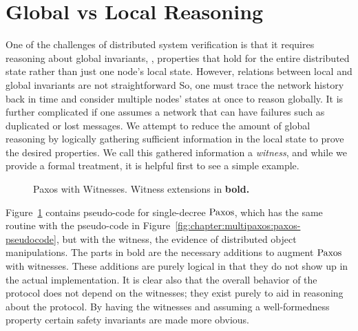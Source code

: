 \section{Global vs Local Reasoning}
\label{chapter:witnesspassing:sec:global-local-reasoning}

One of the challenges of distributed system verification is that it requires reasoning about
global invariants, \ie, properties that hold for the entire distributed state rather than just
one node's local state.
However, relations between local and global invariants are not straightforward 
So,  one must trace the network history back in time and consider multiple
nodes' states at once to reason globally.
It is further complicated if one assumes a network that can have failures such as duplicated
or lost messages.
We attempt to reduce the amount of global reasoning by logically gathering sufficient
information in the local state to prove the desired properties.
We call this gathered information a \textit{witness}, and while we provide a formal treatment, it is helpful first to see a simple example.

\begin{figure}
\begin{minipage}{\linewidth}
\noindent
\begin{multicols}{2}
  
\end{multicols}
\end{minipage}
\caption{Paxos with Witnesses. Witness extensions in \bfseries{bold}.}
\label{fig:chapter:witnesspassing:paxos-witness}
\end{figure}

Figure~\ref{fig:chapter:witnesspassing:paxos-witness} contains pseudo-code for single-decree $\mathrm{Paxos}$,
which has the same routine with the pseudo-code in Figure~\ref{fig:chapter:multipaxos:paxos-pseudocode},
but with the witness, the evidence of distributed object manipulations.
The parts in bold are the necessary additions to augment $\mathrm{Paxos}$ with witnesses.
These additions are purely logical in that they do not show up in the actual implementation.
It is clear also that the overall behavior of the protocol does not depend on the witnesses;
they exist purely to aid in reasoning about the protocol.
By having the witnesses and assuming a well-formedness property certain safety invariants are
made more obvious.

